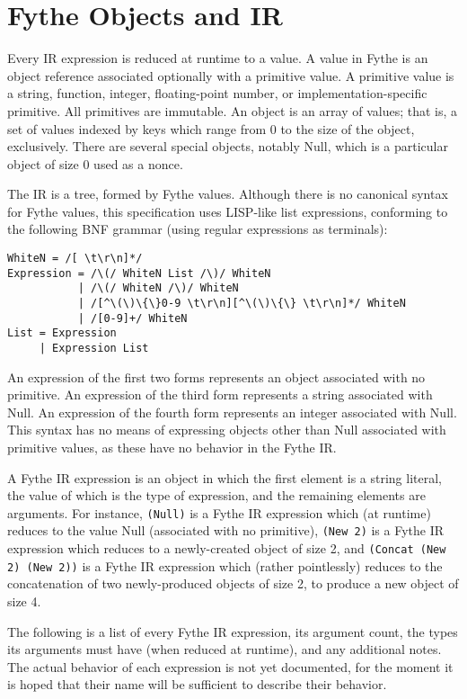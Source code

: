 \chapter{Fythe Objects and IR}

Every IR expression is reduced at runtime to a value. A value in Fythe is an
object reference associated optionally with a primitive value. A primitive
value is a string, function, integer, floating-point number, or
implementation-specific primitive. All primitives are immutable. An object is
an array of values; that is, a set of values indexed by keys which range from 0
to the size of the object, exclusively. There are several special objects,
notably Null, which is a particular object of size 0 used as a nonce.

The IR is a tree, formed by Fythe values. Although there is no canonical syntax
for Fythe values, this specification uses LISP-like list expressions,
conforming to the following BNF grammar (using regular expressions as
terminals):

\begin{verbatim}
WhiteN = /[ \t\r\n]*/
Expression = /\(/ WhiteN List /\)/ WhiteN
           | /\(/ WhiteN /\)/ WhiteN
           | /[^\(\)\{\}0-9 \t\r\n][^\(\)\{\} \t\r\n]*/ WhiteN
           | /[0-9]+/ WhiteN
List = Expression
     | Expression List
\end{verbatim}

An expression of the first two forms represents an object associated with no
primitive. An expression of the third form represents a string associated with
Null. An expression of the fourth form represents an integer associated with
Null. This syntax has no means of expressing objects other than Null associated
with primitive values, as these have no behavior in the Fythe IR.

A Fythe IR expression is an object in which the first element is a string
literal, the value of which is the type of expression, and the remaining
elements are arguments. For instance,
\texttt{(Null)}
is a Fythe IR expression which (at runtime) reduces to the value Null
(associated with no primitive),
\texttt{(New 2)}
is a Fythe IR expression which reduces to a newly-created object of size 2, and
\texttt{(Concat (New 2) (New 2))}
is a Fythe IR expression which (rather pointlessly) reduces to the
concatenation of two newly-produced objects of size 2, to produce a new object
of size 4.

The following is a list of every Fythe IR expression, its argument count, the
types its arguments must have (when reduced at runtime), and any additional
notes. The actual behavior of each expression is not yet documented, for the
moment it is hoped that their name will be sufficient to describe their
behavior.

